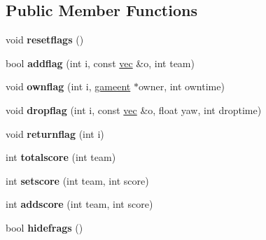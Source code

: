\subsection*{Public Member Functions}
\begin{DoxyCompactItemize}
\item 
\mbox{\label{structgame_1_1ctfclientmode_ae559e772e39b275b8d64d7d321ee6d4d}} 
void {\bfseries resetflags} ()
\item 
\mbox{\label{structgame_1_1ctfclientmode_af12db2eff1c5f931c4204e065e5a140c}} 
bool {\bfseries addflag} (int i, const \hyperlink{structvec}{vec} \&o, int team)
\item 
\mbox{\label{structgame_1_1ctfclientmode_af0fb4e25e321eb1ab12eb73f6d3e5cb5}} 
void {\bfseries ownflag} (int i, \hyperlink{structgameent}{gameent} $\ast$owner, int owntime)
\item 
\mbox{\label{structgame_1_1ctfclientmode_aca4eaf4002e7e9f1b13699773b145dcb}} 
void {\bfseries dropflag} (int i, const \hyperlink{structvec}{vec} \&o, float yaw, int droptime)
\item 
\mbox{\label{structgame_1_1ctfclientmode_a2427d13dd8670605a77eaae48c7a5075}} 
void {\bfseries returnflag} (int i)
\item 
\mbox{\label{structgame_1_1ctfclientmode_a6693acd9b450ac4e6ae4e81eea0a1dec}} 
int {\bfseries totalscore} (int team)
\item 
\mbox{\label{structgame_1_1ctfclientmode_ad81bec17a7730a25f5801b94046dea4b}} 
int {\bfseries setscore} (int team, int score)
\item 
\mbox{\label{structgame_1_1ctfclientmode_a4762fbc769b56485a64a53e314f7543f}} 
int {\bfseries addscore} (int team, int score)
\item 
\mbox{\label{structgame_1_1ctfclientmode_a4c9b796ab4731441883c300a2842219c}} 
bool {\bfseries hidefrags} ()
\item 

\end{DoxyCompactItemize}
